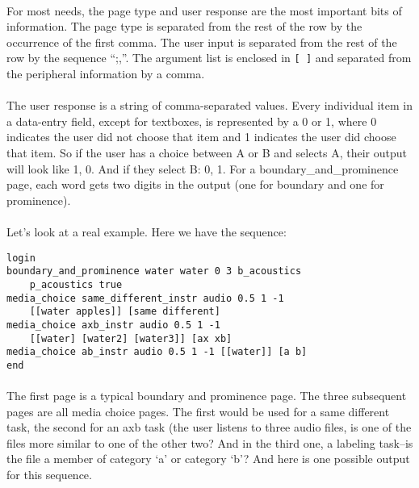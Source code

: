 \paragraph{}
For most needs, the page type and user response are the most important bits of information.  The page type is separated from the rest of the row by the occurrence of the first comma.  The user input is separated from the rest of the row by the sequence ``;,''.  The argument list is enclosed in \texttt{[ ]} and separated from the peripheral information by a comma.  

\paragraph{}
The user response is a string of comma-separated values.  Every individual item in a data-entry field, except for textboxes, is represented by a 0 or 1, where 0 indicates the user did not choose that item and 1 indicates the user did choose that item.  So if the user has a choice between A or B and selects A, their output will look like 1, 0.  And if they select B: 0, 1.  For a boundary\_and\_prominence page, each word gets two digits in the output (one for boundary and one for prominence).

\paragraph{}
Let's look at a real example.  Here we have the sequence:

\begin{lstlisting}
login
boundary_and_prominence water water 0 3 b_acoustics
	p_acoustics true
media_choice same_different_instr audio 0.5 1 -1 
	[[water apples]] [same different]
media_choice axb_instr audio 0.5 1 -1
	[[water] [water2] [water3]] [ax xb]
media_choice ab_instr audio 0.5 1 -1 [[water]] [a b]
end
\end{lstlisting}

\paragraph{}
The first page is a typical boundary and prominence page.  The three subsequent pages are all media choice pages.  The first would be used for a same different task, the second for an axb task (the user listens to three audio files, is one of the files more similar to one of the other two?  And in the third one, a labeling task--is the file a member of category `a' or category `b'?
And here is one possible output for this sequence.

